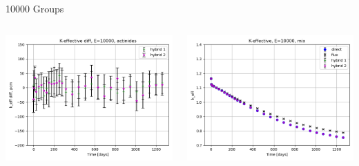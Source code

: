 \documentclass[
	11pt, %
	aspectratio=169, %
]{beamer}
\begin{document}
\begin{frame}{10000 Groups}
\begin{columns}[c]
\begin{column}{0.32\textwidth}
			\includegraphics[width=\textwidth]{../figures/keff/keff_actinides_10000_diff.png}
		\end{column}
		\begin{column}{0.32\textwidth} %
			\includegraphics[width=\textwidth]{../figures/keff/keff_mix_10000.png}


\end{column}
\end{columns}
\end{frame}
\end{document}
